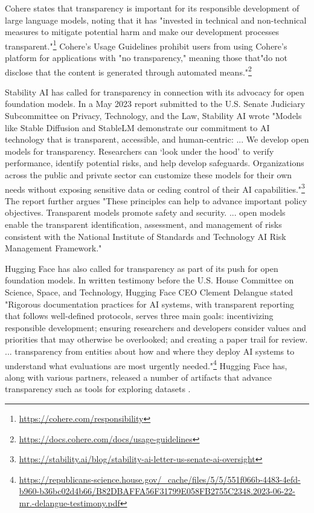 Cohere states that transparency is important for its responsible development of large language models, noting that it has "invested in technical and non-technical measures to mitigate potential harm and make our development processes transparent."\footnote{\url{https://cohere.com/responsibility}} 
Cohere's Usage Guidelines prohibit users from using Cohere's platform for applications with "no transparency," meaning those that"do not disclose that the content is generated through automated means."\footnote{\url{https://docs.cohere.com/docs/usage-guidelines}} 

Stability AI has called for transparency in connection with its advocacy for open foundation models. In a May 2023 report submitted to the U.S. Senate Judiciary Subcommittee on Privacy, Technology, and the Law, Stability AI wrote "Models like Stable Diffusion and StableLM demonstrate our commitment to AI technology that is transparent, accessible, and human-centric: ... We develop open models for transparency. Researchers can `look under the hood' to verify performance, identify potential risks, and help develop safeguards. Organizations across the public and private sector can customize these models for their own needs without exposing sensitive data or ceding control of their AI capabilities."\footnote{\url{https://stability.ai/blog/stability-ai-letter-us-senate-ai-oversight}} The report further argues "These principles can help to advance important policy objectives. Transparent models promote safety and security. ... open models enable the transparent identification, assessment, and management of risks consistent with the National Institute of Standards and Technology AI Risk Management Framework."

Hugging Face has also called for transparency as part of its push for open foundation models. In written testimony before the U.S. House Committee on Science, Space, and Technology, Hugging Face CEO Clement Delangue stated "Rigorous documentation practices for AI systems, with transparent reporting that follows well-defined protocols, serves three main goals: incentivizing responsible development; ensuring researchers and developers consider values and priorities that may otherwise be overlooked; and creating a paper trail for review. ... transparency from entities about how and where they deploy AI systems to understand what evaluations are most urgently needed."\footnote{\url{https://republicans-science.house.gov/_cache/files/5/5/551f066b-4483-4efd-b960-b36bc02d4b66/B82DBAFFA56F31799E058FB2755C2348.2023-06-22-mr.-delangue-testimony.pdf}} Hugging Face has, along with various partners, released a number of artifacts that advance transparency such as tools for exploring datasets \citep{piktus2023roots}. 

